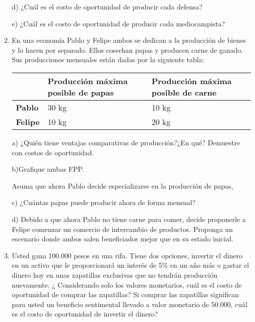 \documentclass{article}
\begin{document}
\begin{enumerate}
d) ¿Cuál es el costo de oportunidad de producir cada defensa?

e) ¿Cuál es el costo de oportunidad de producir cada mediocampista?

    \item  En una economía Pablo y Felipe ambos se dedican a la producción de bienes y lo hacen por separado. Ellos cosechan papas y producen carne de ganado. Sus producciones mensuales están dadas por la siguiente tabla:
    \begin{table}[h!]
\begin{tabular}{|l|l|l|}
\hline
 & \textbf{Producción máxima posible de papas} & \textbf{Producción máxima posible de carne} \\ \hline
\textbf{Pablo} & 30 kg & 10 kg \\ \hline
\textbf{Felipe} & 10 kg & 20 kg \\ \hline
\end{tabular}
\end{table}

a) ¿Quién tiene ventajas comparativas de producción?¿En qué? Demuestre con costos de oportunidad.

b)Grafique ambas FPP.

Asuma que ahora Pablo decide especializarse en la producción de papas,

c) ¿Cuántas papas puede producir ahora de forma mensual?

d) Debido a que ahora Pablo no tiene carne para comer, decide proponerle a Felipe comenzar un comercio de intercambio de productos. Proponga un escenario donde ambos salen beneficiados mejor que en su estado inicial.




    \item Usted gana 100.000 pesos en una rifa. Tiene dos opciones, invertir el dinero en un activo
que le proporcionará un interés de 5\% en un año más o gastar el dinero hoy en unas zapatillas exclusivas que no tendrán producción nuevamente. ¿ Considerando solo los valores monetarios, cuál es el costo de oportunidad de comprar las zapatillas? Si comprar las zapatillas significan para usted un beneficio sentimental llevado a valor monetario de 50.000, cuál es el costo de oportunidad de invertir el dinero?




\end{enumerate}
\end{document}
